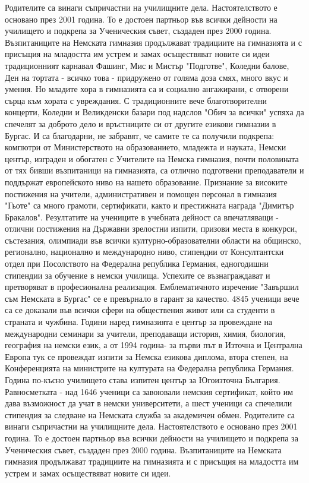 Родителите са винаги съпричастни на училищните дела. Настоятелството е основано през 2001 година. То е достоен партньор във всички дейности на училището и подкрепа за Ученическия съвет, създаден през 2000 година. Възпитаниците на Немската гимназия продължават традициите на гимназията и с присъщия на младостта им устрем и замах осъществяват новите си идеи традиционният карнавал Фашинг, Мис и Мистър "Подготве", Коледни балове, Ден на тортата - всичко това - придружено от голяма доза смях, много вкус и умения. Но младите хора в гимназията са и социално ангажирани, с отворени сърца към хората с увреждания. С традиционните вече благотворителни концерти, Коледни и Великденски базари под надслов "Обич за всички" успяха да спечелят за доброто дело и връстниците си от другите езикови гимназии в Бургас. И са благодарни, не забравят, че самите те са получили подкрепа: компютри от Министерството на образованието, младежта и науката, Немски център, изграден и обогатен с Учителите на Немска гимназия, почти половината от тях бивши възпитаници на гимназията, са отлично подготвени преподаватели и поддържат европейското ниво на нашето образование. Признание за високите постижения на учители, административен и помощен персонал в гимназия "Гьоте" са много грамоти, сертификати, както и престижната награда "Димитър Бракалов". Резултатите на учениците в учебната дейност са впечатляващи - отлични постижения на Държавни зрелостни изпити, призови места в конкурси, състезания, олимпиади във всички културно-образователни области на общинско, регионално, национално и международно ниво, стипендии от Консултантски отдел при Посолството на Федерална република Германия, едногодишни стипендии за обучение в немски училища. Успехите се възнаграждават и претворяват в професионална реализация. Емблематичното изречение "Завършил съм Немската в Бургас" се е превърнало в гарант за качество. 4845 ученици вече са се доказали във всички сфери на обществения живот или са студенти в страната и чужбина. Години наред гимназията е център за провеждане на международни семинари за учители, преподаващи история, химия, биология, география на немски език, а от 1994 година- за първи път в Източна и Централна Европа тук се провеждат изпити за Немска езикова диплома, втора степен, на Конференцията на министрите на културата на Федерална република Германия. Година по-късно училището става изпитен център за Югоизточна България. Равносметката - над 1646 ученици са завоювали немския сертификат, който им дава възможност да учат в немски университети, а шест ученици са спечелили стипендия за следване на Немската служба за академичен обмен. Родителите са винаги съпричастни на училищните дела. Настоятелството е основано през 2001 година. То е достоен партньор във всички дейности на училището и подкрепа за Ученическия съвет, създаден през 2000 година. Възпитаниците на Немската гимназия продължават традициите на гимназията и с присъщия на младостта им устрем и замах осъществяват новите си идеи. 

